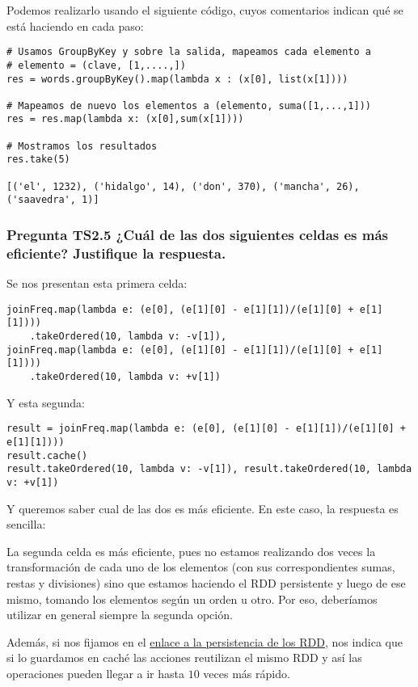 \documentclass[11pt]{article}
\begin{document}
Podemos realizarlo usando el siguiente código, cuyos comentarios indican qué se está haciendo en cada paso:

\begin{verbatim}
# Usamos GroupByKey y sobre la salida, mapeamos cada elemento a
# elemento = (clave, [1,....,])
res = words.groupByKey().map(lambda x : (x[0], list(x[1])))

# Mapeamos de nuevo los elementos a (elemento, suma([1,...,1]))
res = res.map(lambda x: (x[0],sum(x[1])))

# Mostramos los resultados
res.take(5)

[('el', 1232), ('hidalgo', 14), ('don', 370), ('mancha', 26), ('saavedra', 1)]
\end{verbatim}

\subsubsection*{Pregunta TS2.5 ¿Cuál de las dos siguientes celdas es más eficiente? Justifique la respuesta.}

Se nos presentan esta primera celda: 

\begin{verbatim}
joinFreq.map(lambda e: (e[0], (e[1][0] - e[1][1])/(e[1][0] + e[1][1])))
    .takeOrdered(10, lambda v: -v[1]),
joinFreq.map(lambda e: (e[0], (e[1][0] - e[1][1])/(e[1][0] + e[1][1])))
    .takeOrdered(10, lambda v: +v[1])
\end{verbatim}

Y esta segunda:

\begin{verbatim}
result = joinFreq.map(lambda e: (e[0], (e[1][0] - e[1][1])/(e[1][0] + e[1][1])))
result.cache()
result.takeOrdered(10, lambda v: -v[1]), result.takeOrdered(10, lambda v: +v[1])
\end{verbatim}

Y queremos saber cual de las dos es más eficiente. En este caso, la respuesta es sencilla: 

La segunda celda es más eficiente, pues no estamos realizando dos veces la transformación de cada uno de los elementos (con sus correspondientes sumas, restas y divisiones) sino que estamos haciendo el RDD persistente y luego de ese mismo, tomando los elementos según un orden u otro. Por eso, deberíamos utilizar en general siempre la segunda opción.

Además, si nos fijamos en el \href{https://spark.apache.org/docs/2.2.0/rdd-programming-guide.html#rdd-persistence}{enlace a la persistencia de los RDD}, nos indica que si lo guardamos en caché las acciones reutilizan el mismo RDD y así las operaciones pueden llegar a ir hasta $10$ veces más rápido.
\end{document}
